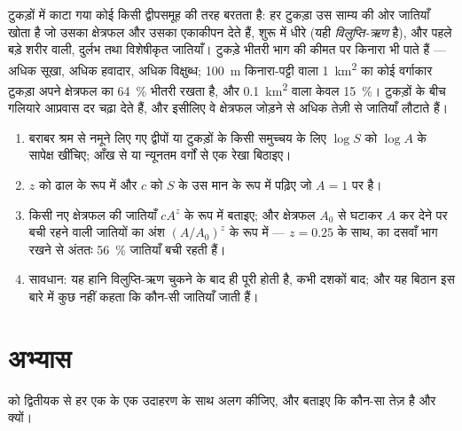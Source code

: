 \begin{proposition}[विखंडन]\label{prop:b1:ecosystem-dynamics:fragmentation}
टुकड़ों में काटा गया कोई  किसी द्वीपसमूह की तरह बरतता है: हर टुकड़ा
उस साम्य की ओर जातियाँ खोता है जो उसका क्षेत्रफल और उसका एकाकीपन देते
हैं, शुरू में धीरे (यही \emph{विलुप्ति-ऋण} है), और पहले बड़े शरीर वाली,
दुर्लभ तथा विशेषीकृत जातियाँ। टुकड़े भीतरी भाग की कीमत पर किनारा भी पाते
हैं --- अधिक सूखा, अधिक हवादार, अधिक विक्षुब्ध; \qty{100}{m} किनारा-पट्टी
वाला \qty{1}{km^2} का कोई वर्गाकार टुकड़ा अपने क्षेत्रफल का
\qty{64}{\%} भीतरी रखता है, और \qty{0.1}{km^2} वाला केवल
\qty{15}{\%}। टुकड़ों के बीच गलियारे आप्रवास दर चढ़ा देते हैं, और इसीलिए
वे क्षेत्रफल जोड़ने से अधिक तेज़ी से जातियाँ लौटाते हैं।
\end{proposition}

\begin{method}\label{met:b1:ecosystem-dynamics:sar}
\begin{enumerate}
  \item बराबर श्रम से नमूने लिए गए द्वीपों या टुकड़ों के किसी समुच्चय के
        लिए $\log S$ को $\log A$ के सापेक्ष खींचिए; आँख से या न्यूनतम
        वर्गों से एक रेखा बिठाइए।
  \item $z$ को ढाल के रूप में और $c$ को $S$ के उस मान के रूप में पढ़िए
        जो $A = 1$ पर है।
  \item किसी नए क्षेत्रफल की जातियाँ $cA^z$ के रूप में बताइए; और
        क्षेत्रफल $A_0$ से घटाकर $A$ कर देने पर बची रहने वाली जातियों का
        अंश $(A/A_0)^z$ के रूप में --- $z = 0.25$ के साथ,  का दसवाँ
        भाग रखने से अंततः \qty{56}{\%} जातियाँ बची रहती हैं।
  \item सावधान: यह हानि विलुप्ति-ऋण चुकने के बाद ही पूरी होती है, कभी
        दशकों बाद; और यह बिठान इस बारे में कुछ नहीं कहता कि कौन-सी
        जातियाँ जाती हैं।
\end{enumerate}
\end{method}

\section{अभ्यास}

\begin{exercise}[$\star$]\label{exo:b1:ecosystem-dynamics:1}
 को द्वितीयक से हर एक के एक उदाहरण के साथ अलग कीजिए, और
बताइए कि कौन-सा तेज़ है और क्यों।
\end{exercise}

